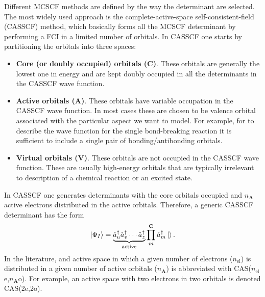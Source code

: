 \documentclass[../Main/chem532-notes.tex]{subfiles}
\newcommand{\mo}[2][black]{
\draw (1.5,#2) -- (2.0,#2);
\filldraw[fill=#1, draw=#1] (1.65,#2) circle (0.04);
\filldraw[fill=#1, draw=#1] (1.85,#2) circle (0.04);
}
\begin{document}
Different MCSCF methods are defined by the way the determinant are selected.
The most widely used approach is the complete-active-space self-consistent-field (CASSCF) method, which basically forms all the MCSCF determinant by performing a FCI in a limited number of orbitals.
In CASSCF one starts by partitioning the orbitals into three spaces:
\begin{itemize}
\item \textbf{Core (or doubly occupied) orbitals ($\mathbf{C}$)}. These orbitals are generally the lowest one in energy and are kept doubly occupied in all the determinants in the CASSCF wave function.
\item \textbf{Active orbitals ($\mathbf{A}$)}. These orbitals have variable occupation in the CASSCF wave function. In most cases these are chosen to be valence orbital associated with the particular aspect we want to model. For example, for to describe the wave function for the single bond-breaking reaction  it is sufficient to include a single pair of  bonding/antibonding orbitals.
\item \textbf{Virtual orbitals ($\mathbf{V}$)}. These orbitals are not occupied in the CASSCF wave function. These are usually high-energy orbitals that are typically irrelevant to description of a chemical reaction or an excited state. 
\end{itemize}

\begin{center}
\end{center}

In CASSCF one generates determinants with the core orbitals occupied and $n_\mathbf{A}$ active electrons distributed in the active orbitals.
Therefore, a generic CASSCF determinant has the form
\begin{equation}
\ket{\Phi_I} = \underbrace{\hat{a}_{u}^{\dagger} \hat{a}_{v}^{\dagger} \cdots  \hat{a}_{z}^{\dagger}}_{\text{active}} \prod_m^\mathbf{C} \hat{a}_{m}^{\dagger} \ket{}.
\end{equation}
In the literature, and active space in which a given number of electrons ($n_\mathrm{el}$) is distributed in a given number of active orbitals ($n_\mathbf{A}$) is abbreviated with CAS($n_\mathrm{el}$e,$n_\mathbf{A}$o).
For example, an active space with two electrons in two orbitals is denoted CAS(2e,2o).
\end{document}
